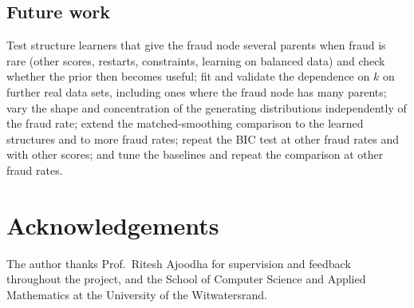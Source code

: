\documentclass[final,5p,times,authoryear]{elsarticle}
\begin{document}
\subsection{Future work}
Test structure learners that give the fraud node several parents when fraud is rare (other scores, restarts, constraints, learning on balanced data) and check whether the prior then becomes useful; fit and validate the dependence on $k$ on further real data sets, including ones where the fraud node has many parents; vary the shape and concentration of the generating distributions independently of the fraud rate; extend the matched-smoothing comparison to the learned structures and to more fraud rates; repeat the BIC test at other fraud rates and with other scores; and tune the baselines and repeat the comparison at other fraud rates.

\section*{Acknowledgements}
The author thanks Prof.\ Ritesh Ajoodha for supervision and feedback throughout the project, and the School of Computer Science and Applied Mathematics at the University of the Witwatersrand.
\end{document}
